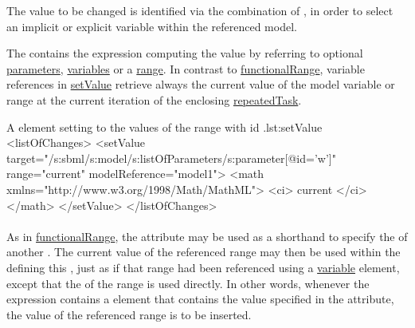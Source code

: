 The value to be changed is identified via the combination of , in order to select an implicit or explicit variable within the referenced model.

The \Math contains the expression computing the value by referring to optional \hyperref[class:parameter]{parameters}, \hyperref[class:variable]{variables} or a \hyperref[class:range]{range}.
In contrast to \hyperref[class:functionalRange]{functionalRange}, variable references in \hyperref[class:setValue]{setValue} retrieve always the current value of the model variable or range at the current iteration of the enclosing \hyperref[class:repeatedTask]{repeatedTask}.

\begin{myXmlLst}{A  element setting  to the values of the range with id .}{lst:setValue}
<listOfChanges>
	<setValue target="/s:sbml/s:model/s:listOfParameters/s:parameter[@id='w']"
		range="current" modelReference="model1">
		<math xmlns="http://www.w3.org/1998/Math/MathML">
			<ci> current </ci>
		</math>
	</setValue>
</listOfChanges>
\end{myXmlLst}

\paragraph*{}
\label{sec:subTaskModelReference}

\paragraph*{}
\label{sec:subTaskRange}

As in \hyperref[class:functionalRange]{functionalRange}, the attribute  may be used as a shorthand to specify the  of another . The current value of the referenced range may then be used within the \Math defining this , just as if that range had been referenced using a \hyperref[class:variable]{variable} element, except that the  of the range is used directly. In other words, whenever the expression contains a  element that contains the value specified in the  attribute, the value of the referenced range is to be inserted.



